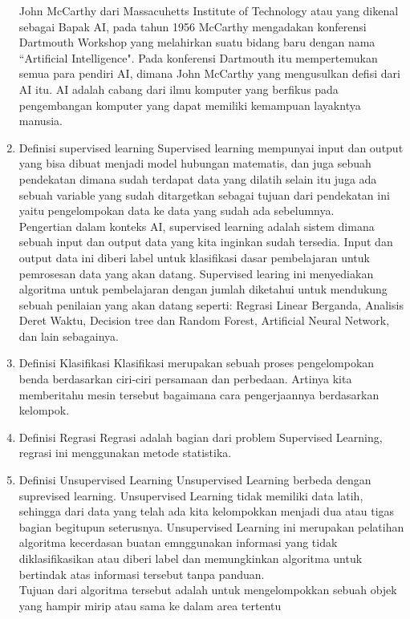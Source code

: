 \begin{enumerate}
John McCarthy dari Massacuhetts Institute of Technology atau yang dikenal sebagai Bapak AI, pada tahun 1956 McCarthy mengadakan konferensi Dartmouth Workshop yang melahirkan suatu bidang baru dengan nama “Artificial Intelligence". Pada konferensi Dartmouth itu mempertemukan semua para pendiri AI, dimana John McCarthy yang mengusulkan defisi dari AI itu. AI adalah cabang dari ilmu komputer yang berfikus pada pengembangan komputer yang dapat memiliki kemampuan layakntya manusia.

\item Definisi supervised learning 
Supervised learning mempunyai input dan output yang bisa dibuat menjadi model hubungan matematis, dan juga sebuah pendekatan dimana sudah terdapat data yang dilatih selain itu juga ada sebuah variable yang sudah ditargetkan sebagai tujuan dari pendekatan ini yaitu pengelompokan data ke data yang sudah ada sebelumnya.\\
Pengertian dalam konteks AI, supervised learning adalah sistem dimana sebuah input dan output data yang kita inginkan sudah tersedia. Input dan output data ini diberi label untuk klasifikasi dasar pembelajaran untuk pemrosesan data yang akan datang. Supervised learing ini menyediakan algoritma untuk pembelajaran dengan jumlah diketahui untuk mendukung sebuah penilaian yang akan datang seperti: Regrasi Linear Berganda, Analisis Deret Waktu, Decision tree dan Random Forest, Artificial Neural Network, dan lain sebagainya.

\item Definisi Klasifikasi
Klasifikasi merupakan sebuah proses pengelompokan benda berdasarkan ciri-ciri persamaan dan perbedaan. Artinya kita memberitahu mesin tersebut bagaimana cara pengerjaannya berdasarkan kelompok.

\item Definisi Regrasi
Regrasi adalah bagian dari problem Supervised Learning, regrasi ini menggunakan metode statistika.

\item Definisi Unsupervised Learning
Unsupervised Learning berbeda dengan suprevised learning. Unsupervised Learning tidak memiliki data latih, sehingga dari data yang telah ada kita kelompokkan menjadi dua atau tigas bagian begitupun seterusnya. Unsupervised Learning ini merupakan pelatihan algoritma kecerdasan buatan emnggunakan informasi yang tidak diklasifikasikan atau diberi label dan memungkinkan algoritma untuk bertindak atas informasi tersebut tanpa panduan. \\
Tujuan dari algoritma tersebut adalah untuk mengelompokkan sebuah objek yang hampir mirip atau sama ke dalam area tertentu


\end{enumerate}
